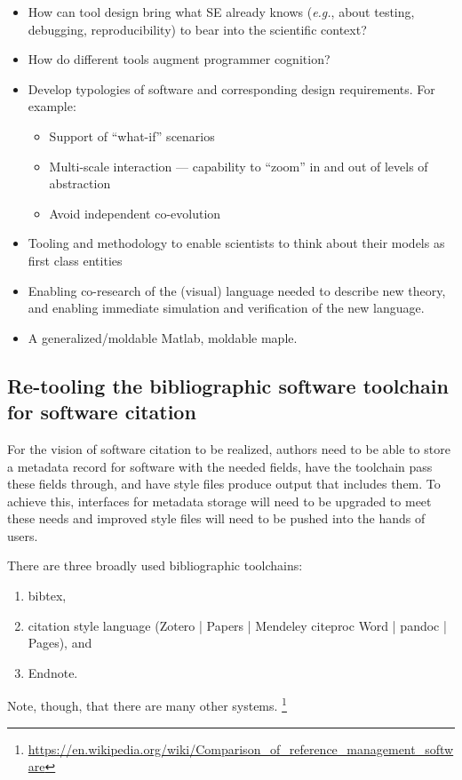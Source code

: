 \documentclass[a4paper,UKenglish]{dagman}
\newcommand{\eg}{\emph{e.g.},\xspace}
\begin{document}
\begin{itemize}
\item How can tool design bring what SE already knows (\eg about testing, debugging, reproducibility) to bear into the scientific context?
\item How do different tools augment programmer cognition?
\item Develop typologies of software and corresponding design requirements. For example:
    \begin{itemize}
    \item Support of ``what-if'' scenarios
    \item Multi-scale interaction --- capability to ``zoom'' in and out of levels of abstraction
    \item Avoid independent co-evolution
    \end{itemize}
\item Tooling and methodology to enable scientists to think about their models as first class entities
\item Enabling co-research of the (visual) language needed to describe new theory, and enabling immediate simulation and verification of the new language.
\item A generalized/moldable Matlab, moldable maple.
\end{itemize}

\subsection{Re-tooling the bibliographic software toolchain for software citation}

For the vision of software citation to be realized, authors need to be able to store a metadata record for software with the needed fields, have the toolchain pass these fields through, and have style files produce output that includes them. To achieve this, interfaces for metadata storage will need to be upgraded to meet these needs and improved style files will need to be pushed into the hands of users.

There are three broadly used bibliographic toolchains:
\begin{enumerate}
\item bibtex, 
\item citation style language (Zotero | Papers | Mendeley \ra citeproc \ra Word | pandoc | Pages),  and \item Endnote.
\end{enumerate}
Note, though, that there are many other systems.%
\footnote{\url{https://en.wikipedia.org/wiki/Comparison_of_reference_management_software}}
\end{document}

